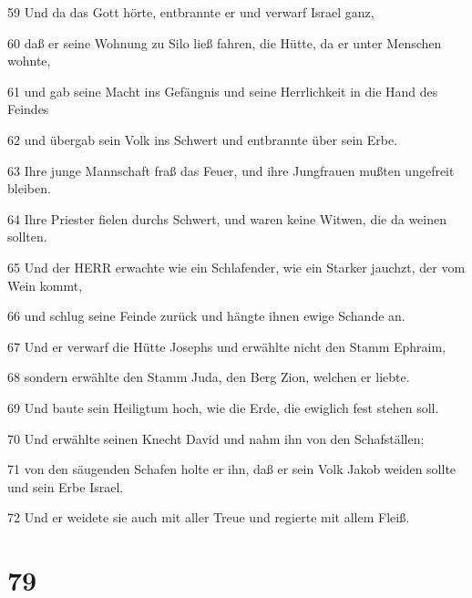 \par 59 Und da das Gott hörte, entbrannte er und verwarf Israel ganz,
\par 60 daß er seine Wohnung zu Silo ließ fahren, die Hütte, da er unter Menschen wohnte,
\par 61 und gab seine Macht ins Gefängnis und seine Herrlichkeit in die Hand des Feindes
\par 62 und übergab sein Volk ins Schwert und entbrannte über sein Erbe.
\par 63 Ihre junge Mannschaft fraß das Feuer, und ihre Jungfrauen mußten ungefreit bleiben.
\par 64 Ihre Priester fielen durchs Schwert, und waren keine Witwen, die da weinen sollten.
\par 65 Und der HERR erwachte wie ein Schlafender, wie ein Starker jauchzt, der vom Wein kommt,
\par 66 und schlug seine Feinde zurück und hängte ihnen ewige Schande an.
\par 67 Und er verwarf die Hütte Josephs und erwählte nicht den Stamm Ephraim,
\par 68 sondern erwählte den Stamm Juda, den Berg Zion, welchen er liebte.
\par 69 Und baute sein Heiligtum hoch, wie die Erde, die ewiglich fest stehen soll.
\par 70 Und erwählte seinen Knecht David und nahm ihn von den Schafställen;
\par 71 von den säugenden Schafen holte er ihn, daß er sein Volk Jakob weiden sollte und sein Erbe Israel.
\par 72 Und er weidete sie auch mit aller Treue und regierte mit allem Fleiß.

\chapter{79}


